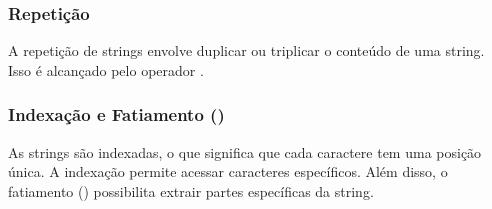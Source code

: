 \documentclass[letterpaper,10pt,english]{jupyterBook}
\begin{document}
\subsubsection{Repetição}
\label{\detokenize{chapters/ch6/ch6:repeticao}}
\sphinxAtStartPar
A repetição de strings envolve duplicar ou triplicar o conteúdo de uma string. Isso é alcançado pelo operador \sphinxcode{\sphinxupquote{*}}.

\sphinxAtStartPar
{}

\begin{sphinxVerbatim}[commandchars=\\\{\}]
    
\end{sphinxVerbatim}

\begin{sphinxVerbatim}[commandchars=\\\{\}]
\end{sphinxVerbatim}


\subsubsection{Indexação e Fatiamento ()}
\label{\detokenize{chapters/ch6/ch6:indexacao-e-fatiamento-slicing}}
\sphinxAtStartPar
As strings são indexadas, o que significa que cada caractere tem uma posição única. A indexação permite acessar caracteres específicos. Além disso, o fatiamento () possibilita extrair partes específicas da string.

\sphinxAtStartPar
{}

\begin{sphinxVerbatim}[commandchars=\\\{\}]
  
  \PYG{p}{[}\PYG{p}{]}
  \PYG{p}{[}\PYG{p}{]}
\end{sphinxVerbatim}

\begin{sphinxVerbatim}[commandchars=\\\{\}]
\end{sphinxVerbatim}
\end{document}
